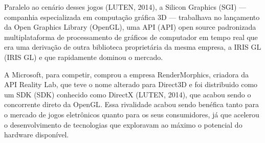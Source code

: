 Paralelo ao cenário desses jogos (LUTEN, 2014)\nocite{openGLBook}, a Silicon Graphics (\acrshort{SGI}) --- companhia especializada em computação gráfica 3D --- trabalhava no lançamento da Open Graphics Library (\acrshort{OpenGL}), uma API (\acrlong{API}) open source padronizada multiplataforma de processamento de gráficos de computador em tempo real que era uma derivação de outra biblioteca proprietária da mesma empresa, a IRIS GL (\acrlong{IRIS GL}) e que rapidamente dominou o mercado. 

A Microsoft, para competir, comprou a empresa RenderMorphics, criadora da \acrshort{API} Reality Lab, que teve o nome alterado para Direct3D e foi distribuido como um SDK (\acrlong{SDK}) conhecido como DirectX (LUTEN, 2014)\nocite{openGLBook}, que acabou sendo o concorrente direto da \acrshort{OpenGL}. Essa rivalidade acabou sendo benéfica tanto para o mercado de jogos eletrônicos quanto para os seus consumidores, já que acelerou o desenvolvimento de tecnologias que exploravam ao máximo o potencial do hardware disponível.
	
